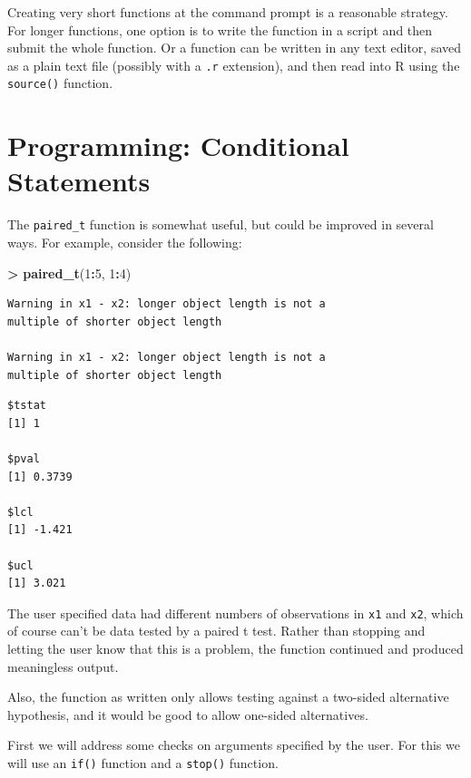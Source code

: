 \documentclass[]{krantz}
\makeatletter
\newenvironment{Shaded}{\begin{snugshade}}{\end{snugshade}}
\newcommand{\DecValTok}[1]{\textcolor[rgb]{0.06,0.06,0.06}{#1}}
\newcommand{\KeywordTok}[1]{\textcolor[rgb]{0.27,0.27,0.27}{\textbf{#1}}}
\newcommand{\NormalTok}[1]{#1}
\newcommand{\OperatorTok}[1]{\textcolor[rgb]{0.43,0.43,0.43}{\textbf{#1}}}
\newcommand{\StringTok}[1]{\textcolor[rgb]{0.5,0.5,0.5}{#1}}
\newenvironment{kframe}{%
\medskip{}
\setlength{\fboxsep}{.8em}
 \def\at@end@of@kframe{}%
 \ifinner\ifhmode%
  \def\at@end@of@kframe{\end{minipage}}%
  \begin{minipage}{\columnwidth}%
 \fi\fi%
 \def\FrameCommand##1{\hskip\@totalleftmargin \hskip-\fboxsep
 \colorbox{shadecolor}{##1}\hskip-\fboxsep
     \hskip-\linewidth \hskip-\@totalleftmargin \hskip\columnwidth}%
 \MakeFramed {\advance\hsize-\width
   \@totalleftmargin\z@ \linewidth\hsize
   \@setminipage}}%
 {\par\unskip\endMakeFramed%
 \at@end@of@kframe}
\renewenvironment{Shaded}{\begin{kframe}}{\end{kframe}}
\makeatother
\begin{document}
Creating very short functions at the command prompt is a reasonable strategy. For longer functions, one option is to write the function in a script and then submit the whole function. Or a function can be written in any text editor, saved as a plain text file (possibly with a \texttt{.r} extension), and then read into R using the \texttt{source()} function.

\hypertarget{programming-conditional-statements}{%
\section{Programming: Conditional Statements}\label{programming-conditional-statements}}

The \texttt{paired\_t} function is somewhat useful, but could be improved in several ways. For example, consider the following:

\begin{Shaded}
\begin{Highlighting}[]
\OperatorTok{>}\StringTok{ }\KeywordTok{paired_t}\NormalTok{(}\DecValTok{1}\OperatorTok{:}\DecValTok{5}\NormalTok{, }\DecValTok{1}\OperatorTok{:}\DecValTok{4}\NormalTok{)}
\end{Highlighting}
\end{Shaded}

\begin{verbatim}
Warning in x1 - x2: longer object length is not a
multiple of shorter object length

Warning in x1 - x2: longer object length is not a
multiple of shorter object length
\end{verbatim}

\begin{verbatim}
$tstat
[1] 1

$pval
[1] 0.3739

$lcl
[1] -1.421

$ucl
[1] 3.021
\end{verbatim}

The user specified data had different numbers of observations in \texttt{x1} and \texttt{x2}, which of course can't be data tested by a paired t test. Rather than stopping and letting the user know that this is a problem, the function continued and produced meaningless output.

Also, the function as written only allows testing against a two-sided alternative hypothesis, and it would be good to allow one-sided alternatives.

First we will address some checks on arguments specified by the user. For this we will use an \texttt{if()} function and a \texttt{stop()} function.
\end{document}
